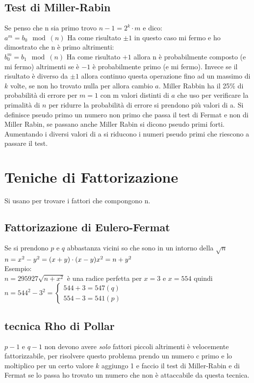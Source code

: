 \documentclass[10pt,a4paper]{article}
\begin{document}
\subsection{Test di Miller-Rabin}
Se penso che n sia primo trovo $n-1=2^k\cdot m$ e dico:\\
$a^m=b_0 \mod(n)$ Ha come risultato $ \pm 1$ in questo caso mi fermo e ho dimostrato che n è primo altrimenti:\\
$b_0^m=b_1 \mod(n)$ Ha come risultato $+1$ allora n è probabilmente composto (e mi fermo) altrimenti se è $-1$ è probabilmente primo (e mi fermo). Invece se il risultato è diverso da $\pm 1$ allora continuo questa operazione fino ad un massimo di $k$ volte, se non ho trovato nulla per allora cambio $a$. Miller Rabbin ha il 25\% di probabilità di errore per $m=1$ con m valori distinti di $a$ che uso per verificare la primalità di $n$ per ridurre la probabilità di errore si prendono più valori di a. Si definisce pseudo primo un numero non primo che passa il test di Fermat e non di Miller Rabin, se passano anche Miller Rabin si dicono pseudo primi forti. Aumentando i diversi valori di a si riducono i numeri pseudo primi che riescono a passare il test.
\section{Teniche di Fattorizazione}
Si usano per trovare i fattori che compongono n.
\subsection{Fattorizazione di Eulero-Fermat}
Se si prendono $p$ e $q$ abbastanza vicini so che sono in un intorno della $\sqrt{n}$
$n=x^2-y^2=(x+y)\cdot(x-y)\\x^2=n+y^2$\\
Esempio:\\
$n=295927 \sqrt{n+x^2}$ è una radice perfetta per $x=3$ e $x=554$ quindi
$n=544^2-3^2=\begin{cases}
544+3 = 547 (q)\\
554-3 = 541 (p)
\end{cases}
$
\subsection{tecnica Rho di Pollar}
$p-1$ e $q-1$ non devono avere \textit{solo} fattori piccoli altrimenti è velocemente fattorizzabile, per risolvere questo problema prendo un numero c primo e lo moltiplico per un certo valore $k$ aggiungo 1 e faccio il test di Miller-Rabin e di Fermat se lo passa ho trovato un numero che non è attaccabile da questa tecnica.
\end{document}
